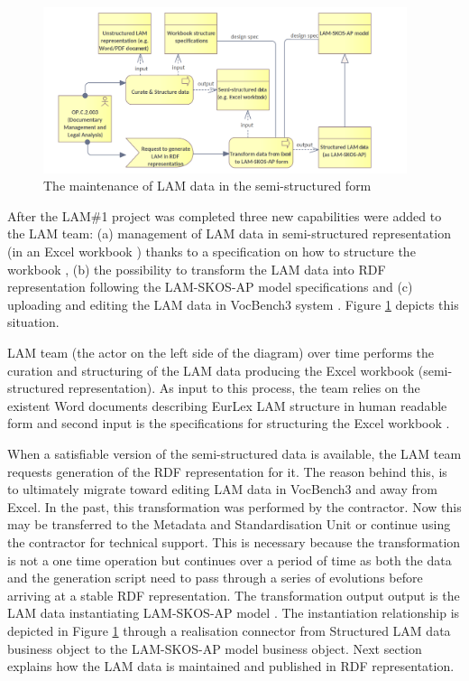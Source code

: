 	\begin{figure}[h]
		\centering
		\includegraphics[width=0.95\textwidth]{images/business/context/post LAM1 context.png}
		\caption{The maintenance of LAM data in the semi-structured form}
		\label{fig:post-lam1-context}
	\end{figure} 
	
	After the LAM\#1 project \citep{lam-preliminary-requirements-2019} was completed three new capabilities were added to the LAM team: (a) management of LAM data in semi-structured representation (in an Excel workbook \cite{excel}) thanks to a specification on how to structure the workbook \citep{lam-excel-structure-2019}, (b) the possibility to transform the LAM data into RDF representation following the LAM-SKOS-AP model specifications \citep{lam-skos-ap-2019} and (c) uploading and editing the LAM data in VocBench3 system \citep{stellato2017towards,stellatovocbench}. Figure \ref{fig:post-lam1-context} depicts this situation. 
	
	LAM team (the actor on the left side of the diagram) over time performs the curation and structuring of the LAM data producing the Excel workbook (semi-structured representation). As input to this process, the team relies on the existent Word documents describing EurLex LAM structure in human readable form \cite{lam-eurlex-spec-2017} and second input is the specifications for structuring the Excel workbook \citep{lam-excel-structure-2019}. 
	
	When a satisfiable version of the semi-structured data is available, the LAM team requests generation of the RDF representation for it. The reason behind this, is to ultimately migrate toward editing LAM data in VocBench3\citep{stellato2017towards} and away from Excel\cite{excel}. In the past, this transformation was performed by the contractor. Now this may be transferred to the Metadata and Standardisation Unit or continue using the contractor for technical support. This is necessary because the transformation is not a one time operation but continues over a period of time as both the data and the generation script need to pass through a series of evolutions before arriving at a stable RDF representation. The transformation output output is the LAM data instantiating LAM-SKOS-AP model \citep{lam-skos-ap-2019}. The instantiation relationship is depicted in Figure \ref{fig:post-lam1-context} through a realisation connector from Structured LAM data business object to the LAM-SKOS-AP model business object. 
	Next section explains how the LAM data is maintained and published in RDF representation. 
	
